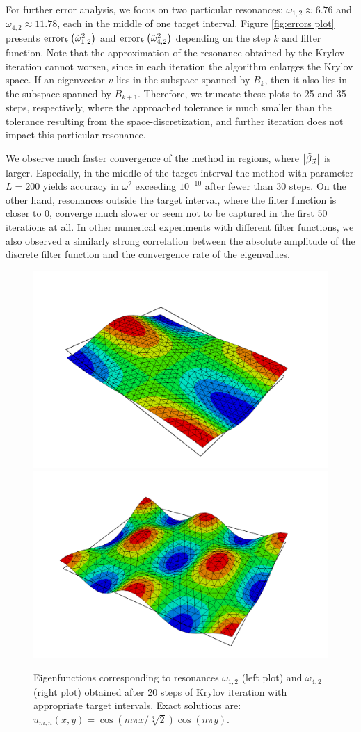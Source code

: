 \documentclass[a4paper,11pt,bibliography=totoc,listof=totoc,headinclude=true,cleardoublepage=empty,oneside]{scrbook}
\newcommand{\dffv}{\Tilde{\beta}_{\Vec{\alpha}}}
\begin{document}
For further error analysis, we focus on two particular resonances: $\omega_{1,2} \approx 6.76$ and $\omega_{4,2} \approx 11.78$, each in the middle of one target interval. Figure \ref{fig:errors plot} presents $\mathrm{error}_{k}\left(\Tilde{\omega}_{1,2}^2\right)$ and $\mathrm{error}_{k}\left(\Tilde{\omega}_{4,2}^2\right)$ depending on the step $k$ and filter function. Note that the approximation of the resonance obtained by the Krylov iteration cannot worsen, since in each iteration the algorithm enlarges the Krylov space. If an eigenvector $v$ lies in the subspace spanned by $B_k$, then it also lies in the subspace spanned by $B_{k+1}$. Therefore, we truncate these plots to 25 and 35 steps, respectively, where the approached tolerance is much smaller than the tolerance resulting from the space-discretization, and further iteration does not impact this particular resonance.

We observe much faster convergence of the method in regions, where $\left|\dffv\right|$ is larger. Especially, in the middle of the target interval the method with parameter $L=200$ yields accuracy in $\omega^2$ exceeding $10^{-10}$ after fewer than 30 steps. On the other hand, resonances outside the target interval, where the filter function is closer to 0, converge much slower or seem not to be captured in the first 50 iterations at all. In other numerical experiments with different filter functions, we also observed a similarly strong correlation between the absolute amplitude of the discrete filter function and the convergence rate of the eigenvalues.


\begin{figure}[h]
    \centering
    \includegraphics[width=0.49\linewidth]{latex//images//simulation/sim_4.png}
    \includegraphics[width=0.49\linewidth]{latex//images//simulation/sim_2.png}
    \caption{Eigenfunctions corresponding to resonances $\omega_{1,2}$ (left plot) and $\omega_{4,2}$ (right plot) obtained after 20 steps of Krylov iteration with appropriate target intervals. Exact solutions are: $u_{m,n}(x,y) = \cos\left(m\pi x /\sqrt[3]{2}\right)\cos(n\pi y)$.}
    \label{fig:enter-label}
\end{figure}
\end{document}
